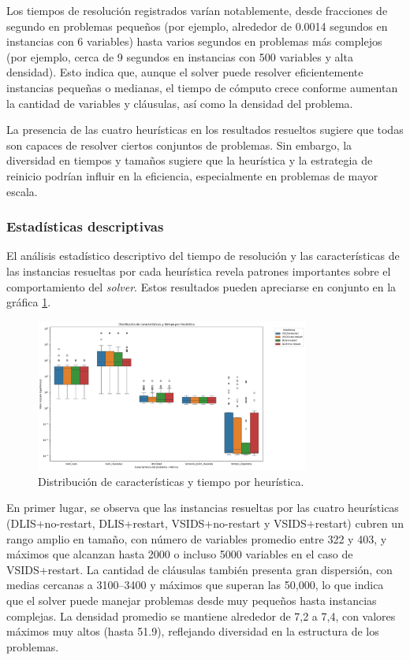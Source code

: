 Los tiempos de resolución registrados varían notablemente, desde fracciones de segundo en problemas pequeños (por ejemplo, alrededor de 0.0014 segundos en instancias con 6 variables) hasta varios segundos en problemas más complejos (por ejemplo, cerca de 9 segundos en instancias con 500 variables y alta densidad). Esto indica que, aunque el solver puede resolver eficientemente instancias pequeñas o medianas, el tiempo de cómputo crece conforme aumentan la cantidad de variables y cláusulas, así como la densidad del problema.

La presencia de las cuatro heurísticas en los resultados resueltos sugiere que todas son capaces de resolver ciertos conjuntos de problemas. Sin embargo, la diversidad en tiempos y tamaños sugiere que la heurística y la estrategia de reinicio podrían influir en la eficiencia, especialmente en problemas de mayor escala.

\subsubsection{Estad\'isticas descriptivas}


El análisis estadístico descriptivo del tiempo de resolución y las características de las instancias resueltas por cada heurística revela patrones importantes sobre el comportamiento del \textit{solver}. Estos resultados pueden apreciarse en conjunto en la gr\'afica \ref{fig:caract-tiempo-x-heuristica}.

\begin{figure}[ht]
    \centering
    \includegraphics[width=0.8\textwidth]{Graphics/caracteristica_tiempo_x_heuristica.png}
    \caption{Distribuci\'on de caracter\'isticas y tiempo por heur\'istica.}
    \label{fig:caract-tiempo-x-heuristica}
\end{figure}


En primer lugar, se observa que las instancias resueltas por las cuatro heurísticas (DLIS+no-restart, DLIS+restart, VSIDS+no-restart y VSIDS+restart) cubren un rango amplio en tamaño, con número de variables promedio entre 322 y 403, y máximos que alcanzan hasta 2000 o incluso 5000 variables en el caso de VSIDS+restart. La cantidad de cláusulas también presenta gran dispersión, con medias cercanas a 3100–3400 y máximos que superan las 50,000, lo que indica que el solver puede manejar problemas desde muy pequeños hasta instancias complejas. La densidad promedio se mantiene alrededor de 7,2 a 7,4, con valores máximos muy altos (hasta 51.9), reflejando diversidad en la estructura de los problemas.

